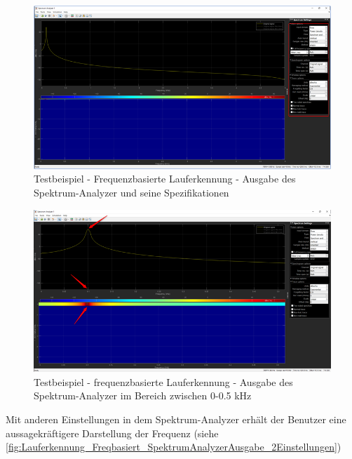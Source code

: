 \begin{figure}[H]
	\centering
	\includegraphics[width=\linewidth]{Bilder/Lauferkennung_Freqbasiert_SpektrumAnalyzerAusgabe.png}
	\caption{Testbeispiel - Frequenzbasierte Lauferkennung - Ausgabe des Spektrum-Analyzer und seine Spezifikationen}
	\label{fig:Lauferkennung_Freqbasiert_SpektrumAnalyzerAusgabe}
\end{figure}

\begin{figure}[H]
	\centering
	\includegraphics[width=\linewidth]{Bilder/Lauferkennung_Freqbasiert_SpektrumAnalyzerAusgabe_gezoomt.png}
	\caption{Testbeispiel - frequenzbasierte Lauferkennung - Ausgabe des Spektrum-Analyzer im Bereich zwischen 0-0.5 kHz}
	\label{fig:Lauferkennung_Freqbasiert_SpektrumAnalyzerAusgabe_gezoomt}
\end{figure}

Mit anderen Einstellungen in dem Spektrum-Analyzer erhält der Benutzer eine aussagekräftigere Darstellung der Frequenz (siehe \autoref{fig:Lauferkennung_Freqbasiert_SpektrumAnalyzerAusgabe_2Einstellungen})

